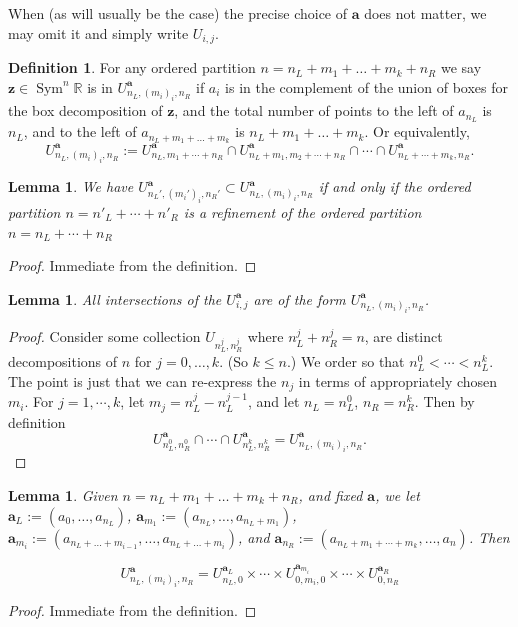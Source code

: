 \documentclass{article}
\def\R{\mathbb{R}}
\def\C{\mathbb{C}}
\DeclareMathOperator{\Sym}{Sym}
\def\bz{\mathbf{z}} %
\def\ba{\mathbf{a}} %
\newtheorem{lemma}[theorem]{Lemma}
\theoremstyle{definition}
\newtheorem{definition}
[theorem]{Definition}
\begin{document}
When (as will usually be the case) the precise choice of $\ba$ does not matter, we may omit it and simply write $U_{i,j}$. 



\begin{definition} \label{def:refined-cover}
    For any ordered partition $n = n_L + m_1 + \ldots + m_k + n_R$    we say $\bz \in \Sym^n \R$ is in $U^{\ba}_{n_L, (m_i)_i, n_R}$ if $a_{i}$ 
is in the complement of the union of boxes for the box decomposition of $\bz$, and the total number of points to the left of $a_{n_L}$ is $n_L$, and to the left of $a_{n_L + m_1 + \ldots + m_k}$ is $n_L + m_1 + \ldots + m_k$.  
Or equivalently,
$$ U^\ba_{n_L, (m_i)_i, n_R} := U_{n_L, m_1 + \cdots + n_R}^\ba \cap U^\ba_{n_L+m_1, m_2 + \cdots + n_R} \cap \cdots \cap U^\ba_{n_L + \cdots + m_k, n_R}.$$ 
\end{definition}

\begin{lemma} \label{U inclusions}
    We have $U^{\ba}_{n_L', (m_i')_i, n_R'} \subset U^{\ba}_{n_L, (m_i)_i, n_R}$ if and only if the ordered partition $n = n'_L + \cdots + n'_R$ is a refinement of the ordered partition $n = n_L + \cdots + n_R $
\end{lemma}
\begin{proof}
    Immediate from the definition. 
\end{proof}


\begin{lemma} \label{U intersections}
    All intersections of the $U^\ba_{i,j}$ are of the form $U^\ba_{n_L, (m_i)_i, n_R}$. 
\end{lemma} 
\begin{proof}
    Consider some collection $U_{n_L^j, n_R^j}$ where $n_L^j + n_R^j = n$, are distinct decompositions of $n$ for $j=0,\ldots,k$.  (So $k \le n$.)  We order so that $n_L^0 < \cdots < n_L^k$.
    The point is just that we can re-express the $n_j$ in terms of appropriately chosen $m_i$.  For $j=1,\cdots,k$, let $m_j = n_L^j - n_L^{j-1}$, and let $n_L = n_L^0$, $n_R = n_R^k$. Then by definition 
    $$U_{n_L^0, n_R^0}^{\mathbf{a}} \cap \cdots \cap U_{n_L^k, n_R^k}^{\mathbf{a}}  =  U_{n_L, (m_i)_i, n_R}^{\mathbf{a}} .$$
\end{proof}


\begin{lemma} \label{U product}
    Given $n = n_L + m_1 + \ldots + m_k + n_R$, and fixed $\mathbf{a}$, we let $\mathbf{a}_L := (a_0, \ldots, a_{n_L})$, 
    $\ba_{m_1} := (a_{n_L}, \ldots, a_{n_L + m_1})$,
    $\ba_{m_i} := (a_{n_L + \ldots + m_{i-1}}, \ldots, a_{n_L + \ldots + m_{i}})$, 
    and $\ba_{n_R} := (a_{n_L+ m_1 + \cdots + m_k}, \ldots, a_n)$.  Then
    
    $$U^\ba_{n_L, (m_i)_i, n_R}= U^{\ba_L}_{n_L, 0} \times \cdots \times U_{0, m_i, 0}^{\ba_{m_i}} \times \cdots \times U^{\ba_R}_{0, n_R}$$ 
\end{lemma}
\begin{proof}
    Immediate from the definition. 
\end{proof}
\end{document}
